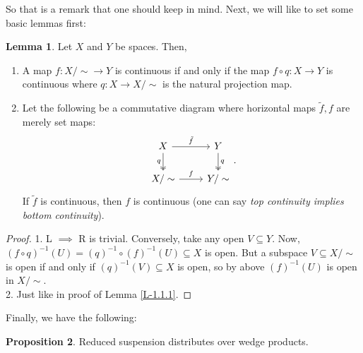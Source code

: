 \documentclass[letterpaper,11pt,twoside]{article}
\theoremstyle{definition}
\newtheorem{proposition}{Proposition}[subsection]
\theoremstyle{definition}
\theoremstyle{definition}
\theoremstyle{definition}
\newtheorem{lemma}[proposition]{\textbf{Lemma}}
\theoremstyle{definition}
\theoremstyle{definition}
\theoremstyle{remark}
\theoremstyle{definition}
\newcommand{\inv}[1]{\left(#1\right)^{-1}}
\begin{document}
	So that is a remark that one should keep in mind. Next, we will like to set some basic lemmas first:
    
    \begin{lemma}\label{L-1.2.2}
        Let $X$ and $Y$ be spaces. Then,
        \begin{enumerate}
            \item {A map $f : X/\sim \longrightarrow Y$ is continuous if and only if the map $f\circ q : X\to Y$ is continuous where $q : X\to X/\sim$ is the natural projection map.}
            \item {Let the following be a commutative diagram where horizontal maps $\tilde{f},f$ are merely set maps:
\[\begin{tikzcd}
	X & Y \\
	{X/\sim} & {Y/\sim}
	\arrow["f", from=2-1, to=2-2]
	\arrow["{\tilde{f}}", from=1-1, to=1-2]
	\arrow["q"', two heads, from=1-1, to=2-1]
	\arrow["q", two heads, from=1-2, to=2-2]
\end{tikzcd}.\]
If $\tilde{f}$ is continuous, then $f$ is continuous (one can say \textit{top continuity implies bottom continuity}).
            }
            
        \end{enumerate}
    \end{lemma}
    \begin{proof}
        1. L $\implies$ R is trivial. Conversely, take any open $V\subseteq Y$. Now, $\inv{f\circ q}(U) = \inv{q} \circ \inv{f}(U) \subseteq X$ is open. But a subspace $V\subseteq X/\sim$ is open if and only if $\inv{q}(V)\subseteq X$ is open, so by above $\inv{f}(U)$ is open in $X/\sim$.\\
        2. Just like in proof of Lemma \ref{L-1.1.1}.
    \end{proof}
 Finally, we have the following:
 \begin{proposition}
 Reduced suspension distributes over wedge products.
 \end{proposition}
\end{document}
